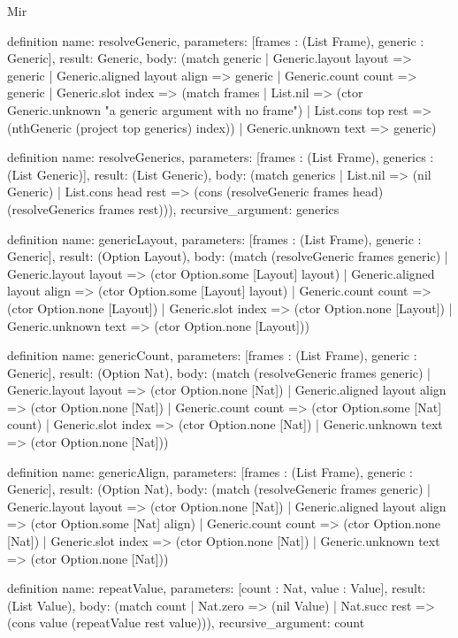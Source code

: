 \begin{lexlean}{Mir}
\begin{semanticmodule}
definition{
  name: resolveGeneric,
  parameters: [frames : (List Frame), generic : Generic],
  result: Generic,
  body: (match generic
    | Generic.layout layout => generic
    | Generic.aligned layout align => generic
    | Generic.count count => generic
    | Generic.slot index => (match frames
      | List.nil => (ctor Generic.unknown "a generic argument with no frame")
      | List.cons top rest => (nthGeneric (project top generics) index))
    | Generic.unknown text => generic)
}

definition{
  name: resolveGenerics,
  parameters: [frames : (List Frame), generics : (List Generic)],
  result: (List Generic),
  body: (match generics
    | List.nil => (nil Generic)
    | List.cons head rest => (cons (resolveGeneric frames head) (resolveGenerics frames rest))),
  recursive_argument: generics
}

definition{
  name: genericLayout,
  parameters: [frames : (List Frame), generic : Generic],
  result: (Option Layout),
  body: (match (resolveGeneric frames generic)
    | Generic.layout layout => (ctor Option.some [Layout] layout)
    | Generic.aligned layout align => (ctor Option.some [Layout] layout)
    | Generic.count count => (ctor Option.none [Layout])
    | Generic.slot index => (ctor Option.none [Layout])
    | Generic.unknown text => (ctor Option.none [Layout]))
}

definition{
  name: genericCount,
  parameters: [frames : (List Frame), generic : Generic],
  result: (Option Nat),
  body: (match (resolveGeneric frames generic)
    | Generic.layout layout => (ctor Option.none [Nat])
    | Generic.aligned layout align => (ctor Option.none [Nat])
    | Generic.count count => (ctor Option.some [Nat] count)
    | Generic.slot index => (ctor Option.none [Nat])
    | Generic.unknown text => (ctor Option.none [Nat]))
}

definition{
  name: genericAlign,
  parameters: [frames : (List Frame), generic : Generic],
  result: (Option Nat),
  body: (match (resolveGeneric frames generic)
    | Generic.layout layout => (ctor Option.none [Nat])
    | Generic.aligned layout align => (ctor Option.some [Nat] align)
    | Generic.count count => (ctor Option.none [Nat])
    | Generic.slot index => (ctor Option.none [Nat])
    | Generic.unknown text => (ctor Option.none [Nat]))
}

definition{
  name: repeatValue,
  parameters: [count : Nat, value : Value],
  result: (List Value),
  body: (match count
    | Nat.zero => (nil Value)
    | Nat.succ rest => (cons value (repeatValue rest value))),
  recursive_argument: count
}


\end{semanticmodule}
\end{lexlean}
